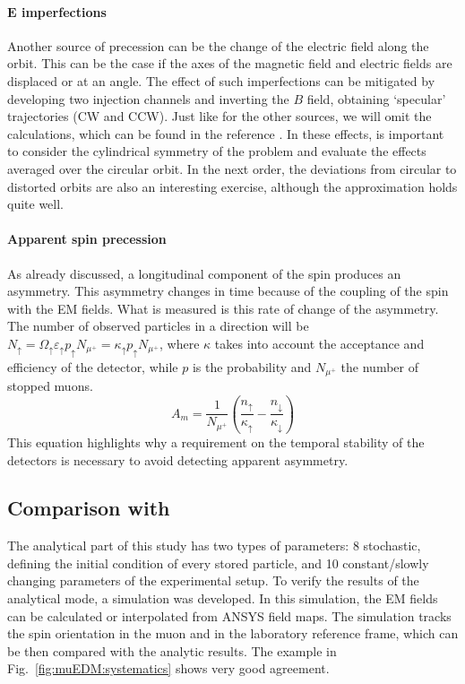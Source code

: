 \begin{refsection}
        \paragraph{$\bm{E}$ imperfections} Another source of precession can be the change of the electric field along the orbit.
        This can be the case if the axes of the magnetic field and electric fields are displaced or at an angle.
        The effect of such imperfections can be mitigated by developing two injection channels and inverting the $B$ field, obtaining `specular' trajectories (CW and CCW).
        Just like for the other sources, we will omit the calculations, which can be found in the reference \cite{chavdar:2023}. 
        In these effects, is important to consider the cylindrical symmetry of the problem and evaluate the effects averaged over the circular orbit.
        In the next order, the deviations from circular to distorted orbits are also an interesting exercise, although the approximation holds quite well.

        \paragraph{Apparent spin precession} As already discussed, a longitudinal component of the spin produces an asymmetry. 
        This asymmetry changes in time because of the coupling of the spin with the EM fields. 
        What is measured is this rate of change of the asymmetry.
        The number of observed particles in a direction will be $N_\uparrow = \Omega_\uparrow\varepsilon_\uparrow p_\uparrow N_{\mu^+} =  \kappa_\uparrow p_\uparrow N_{\mu^+}$, where $\kappa$ takes into account the acceptance and efficiency of the detector, while $p$ is the probability and $N_{\mu^+}$ the number of stopped muons.
        \begin{equation}
            A_m = \frac{1}{N_{\mu^+}} \left( \frac{n_\uparrow}{\kappa_\uparrow} - \frac{n_\downarrow}{\kappa_\downarrow} \right)
        \end{equation}
        This equation highlights why a requirement on the temporal stability of the detectors is necessary to avoid detecting apparent asymmetry.

    \subsection{Comparison with \gf}
        The analytical part of this study has two types of parameters: 8 stochastic, defining the initial condition of every stored particle, and 10 constant/slowly changing parameters of the experimental setup. 
        To verify the results of the analytical mode, a \gf simulation was developed.
        In this simulation, the EM fields can be calculated or interpolated from ANSYS field maps.
        The simulation tracks the spin orientation in the muon and in the laboratory reference frame, which can be then compared with the analytic results.
        The example in Fig.~\ref{fig:muEDM:systematics} shows very good agreement.


\end{refsection}

